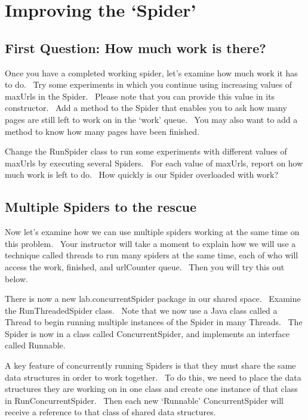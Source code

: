 \documentclass[letterpaper,10pt,openany,oneside]{sphinxmanual}
\begin{document}
\chapter{Improving the ‘Spider’}
\label{SpiderLabpart2/SpiderLabpart2:improving-the-spider}\label{SpiderLabpart2/SpiderLabpart2::doc}

\section{First Question: How much work is there?}
\label{SpiderLabpart2/SpiderLabpart2:first-question-how-much-work-is-there}
Once you have a completed working spider, let’s examine how much
work it has to do.  Try some experiments in which you continue
using increasing values of maxUrls in the Spider.  Please note that
you can provide this value in its constructor.  Add a method to the
Spider that enables you to ask how many pages are still left to
work on in the ‘work’ queue.  You may also want to add a method to
know how many pages have been finished.

Change the RunSpider class to run some experiments with different
values of maxUrls by executing several Spiders.  For each value of
maxUrls, report on how much work is left to do.  How quickly is our
Spider overloaded with work?


\section{Multiple Spiders to the rescue}
\label{SpiderLabpart2/SpiderLabpart2:multiple-spiders-to-the-rescue}
Now let’s examine how we can use multiple spiders working at the
same time on this problem.  Your instructor will take a moment to
explain how we will use a technique called threads to run many
spiders at the same time, each of who will access the work,
finished, and urlCounter queue.  Then you will try this out below.

There is now a new lab.concurrentSpider package in our shared
space.  Examine the RunThreadedSpider class.  Note that we now use
a Java class called a Thread to begin running multiple instances of
the Spider in many Threads.  The Spider is now in a class called
ConcurrentSpider, and implements an interface called Runnable.

A key feature of concurrently running Spiders is that they must
share the same data structures in order to work together.  To do
this, we need to place the data structures they are working on in
one class and create one instance of that class in
RunConcurrentSpider.  Then each new ‘Runnable’ ConcurrentSpider
will receive a reference to that class of shared data structures.
\end{document}
